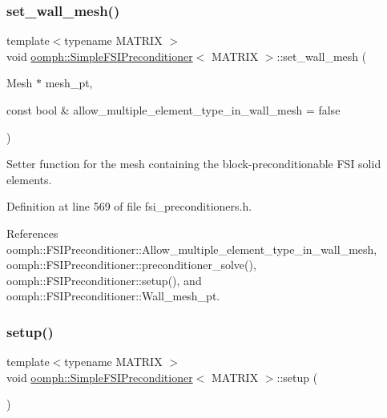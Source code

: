 \subsubsection{\texorpdfstring{set\+\_\+wall\+\_\+mesh()}{set\_wall\_mesh()}}
{\footnotesize\ttfamily template$<$typename M\+A\+T\+R\+IX $>$ \\
void \hyperlink{classoomph_1_1SimpleFSIPreconditioner}{oomph\+::\+Simple\+F\+S\+I\+Preconditioner}$<$ M\+A\+T\+R\+IX $>$\+::set\+\_\+wall\+\_\+mesh (\begin{DoxyParamCaption}\item[{Mesh $\ast$}]{mesh\+\_\+pt,  }\item[{const bool \&}]{allow\+\_\+multiple\+\_\+element\+\_\+type\+\_\+in\+\_\+wall\+\_\+mesh = {\ttfamily false} }\end{DoxyParamCaption})\hspace{0.3cm}{\ttfamily [inline]}}



Setter function for the mesh containing the block-\/preconditionable F\+SI solid elements. 



Definition at line 569 of file fsi\+\_\+preconditioners.\+h.



References oomph\+::\+F\+S\+I\+Preconditioner\+::\+Allow\+\_\+multiple\+\_\+element\+\_\+type\+\_\+in\+\_\+wall\+\_\+mesh, oomph\+::\+F\+S\+I\+Preconditioner\+::preconditioner\+\_\+solve(), oomph\+::\+F\+S\+I\+Preconditioner\+::setup(), and oomph\+::\+F\+S\+I\+Preconditioner\+::\+Wall\+\_\+mesh\+\_\+pt.

\mbox{\label{classoomph_1_1SimpleFSIPreconditioner_aaf19c0c3f19f6d8ef4f36a1581829230}} 
\subsubsection{\texorpdfstring{setup()}{setup()}}
{\footnotesize\ttfamily template$<$typename M\+A\+T\+R\+IX $>$ \\
void \hyperlink{classoomph_1_1SimpleFSIPreconditioner}{oomph\+::\+Simple\+F\+S\+I\+Preconditioner}$<$ M\+A\+T\+R\+IX $>$\+::setup (\begin{DoxyParamCaption}{ }\end{DoxyParamCaption})}



